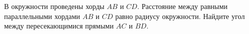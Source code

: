 \begin{ex}
	\begin{condition}
		В окружности проведены хорды \( AB  \) и \( CD \). Расстояние между равными параллельными хордами \( AB  \) и \( CD  \) равно радиусу окружности. Найдите угол между пересекающимися прямыми \( AC  \) и \( BD \).
	\end{condition}
\end{ex}